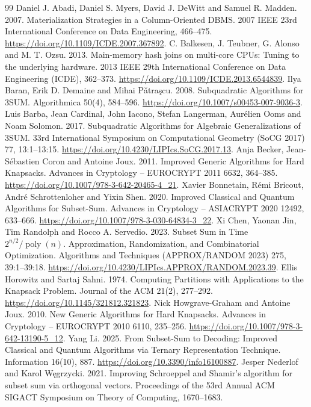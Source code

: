 \documentclass[manuscript,screen,review]{acmart}
\begin{document}
\clearpage
\begin{thebibliography}{99}
Daniel J. Abadi, Daniel S. Myers, David J. DeWitt and Samuel R. Madden. 2007. Materialization Strategies in a Column-Oriented DBMS. 2007 IEEE 23rd International Conference on Data Engineering, 466–475.
\url{https://doi.org/10.1109/ICDE.2007.367892}.
C. Balkesen, J. Teubner, G. Alonso and M. T. Ozsu. 2013. Main-memory hash joins on multi-core CPUs: Tuning to the underlying hardware. 2013 IEEE 29th International Conference on Data Engineering (ICDE), 362–373.
\url{https://doi.org/10.1109/ICDE.2013.6544839}.
Ilya Baran, Erik D. Demaine and Mihai Pǎtraşcu. 2008. Subquadratic Algorithms for 3SUM. Algorithmica 50(4), 584–596.
\url{https://doi.org/10.1007/s00453-007-9036-3}.
Luis Barba, Jean Cardinal, John Iacono, Stefan Langerman, Aurélien Ooms and Noam Solomon. 2017. Subquadratic Algorithms for Algebraic Generalizations of 3SUM. 33rd International Symposium on Computational Geometry (SoCG 2017) 77, 13:1–13:15.
\url{https://doi.org/10.4230/LIPIcs.SoCG.2017.13}.
Anja Becker, Jean-Sébastien Coron and Antoine Joux. 2011. Improved Generic Algorithms for Hard Knapsacks. Advances in Cryptology -- EUROCRYPT 2011 6632, 364–385.
\url{https://doi.org/10.1007/978-3-642-20465-4_21}.
Xavier Bonnetain, Rémi Bricout, André Schrottenloher and Yixin Shen. 2020. Improved Classical and Quantum Algorithms for Subset-Sum. Advances in Cryptology -- ASIACRYPT 2020 12492, 633–666.
\url{https://doi.org/10.1007/978-3-030-64834-3_22}.
Xi Chen, Yaonan Jin, Tim Randolph and Rocco A. Servedio. 2023. Subset Sum in Time $2^{n/2}/\operatorname{poly}(n)$. Approximation, Randomization, and Combinatorial Optimization. Algorithms and Techniques (APPROX/RANDOM 2023) 275, 39:1–39:18.
\url{https://doi.org/10.4230/LIPIcs.APPROX/RANDOM.2023.39}.
Ellis Horowitz and Sartaj Sahni. 1974. Computing Partitions with Applications to the Knapsack Problem. Journal of the ACM 21(2), 277–292.
\url{https://doi.org/10.1145/321812.321823}.
Nick Howgrave-Graham and Antoine Joux. 2010. New Generic Algorithms for Hard Knapsacks. Advances in Cryptology -- EUROCRYPT 2010 6110, 235–256.
\url{https://doi.org/10.1007/978-3-642-13190-5_12}.
Yang Li. 2025. From Subset-Sum to Decoding: Improved Classical and Quantum Algorithms via Ternary Representation Technique. Information 16(10), 887.
\url{https://doi.org/10.3390/info16100887}.
Jesper Nederlof and Karol Węgrzycki. 2021. Improving Schroeppel and Shamir’s algorithm for subset sum via orthogonal vectors. Proceedings of the 53rd Annual ACM SIGACT Symposium on Theory of Computing, 1670–1683.

\end{thebibliography}
\end{document}
